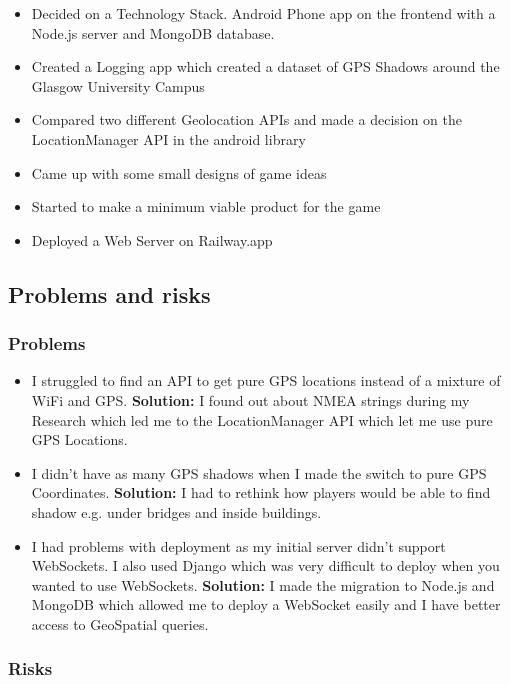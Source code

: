 \documentclass[11pt]{article}
\begin{document}
\begin{itemize}
    \tightlist
\item Decided on a Technology Stack. Android Phone app on the frontend with a Node.js server and MongoDB database. 
\item Created a Logging app which created a dataset of GPS Shadows around the Glasgow University Campus
\item Compared two different Geolocation APIs and made a decision on the LocationManager API in the android library
\item Came up with some small designs of game ideas
\item Started to make a minimum viable product for the game
\item Deployed a Web Server on Railway.app

\end{itemize}

\subsection{Problems and risks}\label{problems-and-risks}

\subsubsection{Problems}\label{problems}
\begin{itemize}
    \tightlist
    \item I struggled to find an API to get pure GPS locations instead of a mixture of WiFi and GPS. \textbf{Solution:} I found out about NMEA
    strings during my Research which led me to the LocationManager API which let me use pure GPS Locations.

    \item I didn't have as many GPS shadows when I made the switch to pure GPS Coordinates. \textbf{Solution: } I had to rethink
    how players would be able to find shadow e.g. under bridges and inside buildings.

    \item I had problems with deployment as my initial server didn't support WebSockets. I also used Django which was very difficult to deploy
    when you wanted to use WebSockets. \textbf{Solution:} I made the migration to Node.js and MongoDB which allowed me to deploy a WebSocket easily
    and I have better access to GeoSpatial queries.
\end{itemize}

\subsubsection{Risks}\label{risks}
\end{document}
